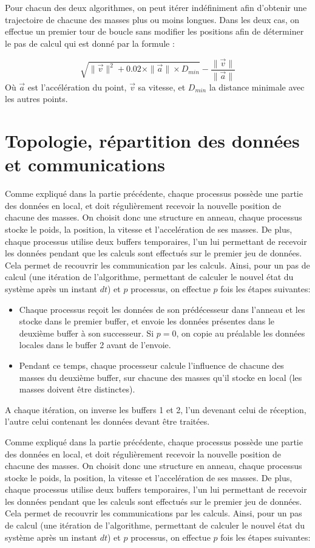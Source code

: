 \documentclass[a4paper,11pt]{article}
\begin{document}
Pour chacun des deux algorithmes, on peut itérer indéfiniment afin d'obtenir une trajectoire de chacune des masses plus ou moins longues. Dans les deux cas, on effectue un premier tour de boucle sans modifier les positions afin de déterminer le pas de calcul qui est donné par la formule :

\[
\sqrt{\|\vec{v}\|^2 + 0.02 \times \|\vec{a}\| \times \mathit{D_{min}}} - \frac{\| \vec{v}\|}{\| \vec{a} \|}
\] 
Où $\vec{a}$ est l'accélération du point, $\vec{v}$ sa vitesse, et $\mathit{D_{min}}$ la distance minimale avec les autres points.




\section{Topologie, répartition des données et communications}

Comme expliqué dans la partie précédente, chaque processus possède une partie des données en local, et doit régulièrement recevoir la nouvelle position de chacune des masses. On choisit donc une structure en anneau, chaque processus stocke le poids, la position, la vitesse et l'accelération de ses masses. De plus, chaque processus utilise deux buffers temporaires, l'un lui permettant de recevoir les données pendant que les calculs sont effectués sur le premier jeu de données. Cela permet de recouvrir les communication par les calculs. Ainsi, pour un pas de calcul (une itération de l'algorithme, permettant de calculer le nouvel état du système après un instant $dt$) et $p$ processus, on effectue $p$ fois les étapes suivantes:
\begin{itemize}
\item Chaque processus reçoit les données de son prédécesseur dans l'anneau et les stocke dans le premier buffer, et envoie les données présentes dans le deuxième buffer à son successeur. Si $p = 0$, on copie au préalable les données locales dans le buffer 2 avant de l'envoie.
\item Pendant ce temps, chaque processeur calcule l'influence de chacune des masses du deuxième buffer, sur chacune des masses qu'il stocke en local (les masses doivent être distinctes).
\end{itemize}
 A chaque itération, on inverse les buffers 1 et 2, l'un devenant celui de réception, l'autre celui contenant les données devant être traitées.

Comme expliqué dans la partie précédente, chaque processus possède une partie des données en local, et doit régulièrement recevoir la nouvelle position de chacune des masses. On choisit donc une structure en anneau, chaque processus stocke le poids, la position, la vitesse et l'accelération de ses masses. De plus, chaque processus utilise deux buffers temporaires, l'un lui permettant de recevoir les données pendant que les calculs sont effectués sur le premier jeu de données. Cela permet de recouvrir les communications par les calculs. Ainsi, pour un pas de calcul (une itération de l'algorithme, permettant de calculer le nouvel état du système après un instant $dt$) et $p$ processus, on effectue $p$ fois les étapes suivantes:
\end{document}
